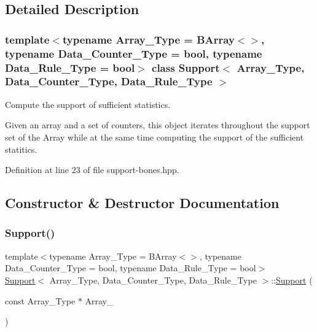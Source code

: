 \subsection{Detailed Description}
\subsubsection*{template$<$typename Array\+\_\+\+Type = B\+Array$<$$>$, typename Data\+\_\+\+Counter\+\_\+\+Type = bool, typename Data\+\_\+\+Rule\+\_\+\+Type = bool$>$\newline
class Support$<$ Array\+\_\+\+Type, Data\+\_\+\+Counter\+\_\+\+Type, Data\+\_\+\+Rule\+\_\+\+Type $>$}

Compute the support of sufficient statistics. 

Given an array and a set of counters, this object iterates throughout the support set of the Array while at the same time computing the support of the sufficient statitics. 

Definition at line 23 of file support-\/bones.\+hpp.



\subsection{Constructor \& Destructor Documentation}
\mbox{\label{class_support_aacc2852ede9e8d1294b8f2ea5625d525}} 
\subsubsection{\texorpdfstring{Support()}{Support()}\hspace{0.1cm}{\footnotesize\ttfamily [1/3]}}
{\footnotesize\ttfamily template$<$typename Array\+\_\+\+Type = B\+Array$<$$>$, typename Data\+\_\+\+Counter\+\_\+\+Type = bool, typename Data\+\_\+\+Rule\+\_\+\+Type = bool$>$ \\
\hyperlink{class_support}{Support}$<$ Array\+\_\+\+Type, Data\+\_\+\+Counter\+\_\+\+Type, Data\+\_\+\+Rule\+\_\+\+Type $>$\+::\hyperlink{class_support}{Support} (\begin{DoxyParamCaption}\item[{const Array\+\_\+\+Type $\ast$}]{Array\+\_\+ }\end{DoxyParamCaption})\hspace{0.3cm}{\ttfamily [inline]}}



